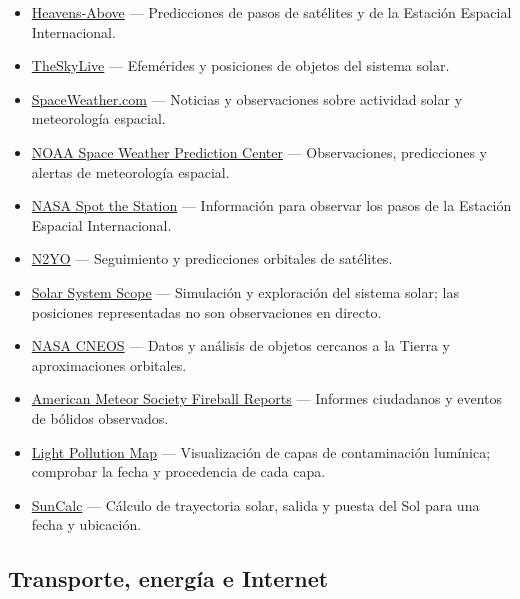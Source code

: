 \documentclass[
  letterpaper,
  DIV=11,
  numbers=noendperiod]{scrartcl}
\providecommand{\tightlist}{%
  \setlength{\itemsep}{0pt}\setlength{\parskip}{0pt}}
\begin{document}
\begin{itemize}
\tightlist
\item
  \href{https://heavens-above.com/}{Heavens-Above} --- Predicciones de
  pasos de satélites y de la Estación Espacial Internacional.
\item
  \href{https://theskylive.com/}{TheSkyLive} --- Efemérides y posiciones
  de objetos del sistema solar.
\item
  \href{https://spaceweather.com/}{SpaceWeather.com} --- Noticias y
  observaciones sobre actividad solar y meteorología espacial.
\item
  \href{https://www.spaceweather.gov/}{NOAA Space Weather Prediction
  Center} --- Observaciones, predicciones y alertas de meteorología
  espacial.
\item
  \href{https://www.nasa.gov/spot-the-station/}{NASA Spot the Station}
  --- Información para observar los pasos de la Estación Espacial
  Internacional.
\item
  \href{https://n2yo.com/}{N2YO} --- Seguimiento y predicciones
  orbitales de satélites.
\item
  \href{https://solarsystemscope.com/}{Solar System Scope} ---
  Simulación y exploración del sistema solar; las posiciones
  representadas no son observaciones en directo.
\item
  \href{https://cneos.jpl.nasa.gov/}{NASA CNEOS} --- Datos y análisis de
  objetos cercanos a la Tierra y aproximaciones orbitales.
\item
  \href{https://fireball.amsmeteors.org/}{American Meteor Society
  Fireball Reports} --- Informes ciudadanos y eventos de bólidos
  observados.
\item
  \href{https://lightpollutionmap.info/}{Light Pollution Map} ---
  Visualización de capas de contaminación lumínica; comprobar la fecha y
  procedencia de cada capa.
\item
  \href{https://suncalc.org/}{SunCalc} --- Cálculo de trayectoria solar,
  salida y puesta del Sol para una fecha y ubicación.
\end{itemize}

\subsection{Transporte, energía e
Internet}\label{transporte-energuxeda-e-internet}
\end{document}
